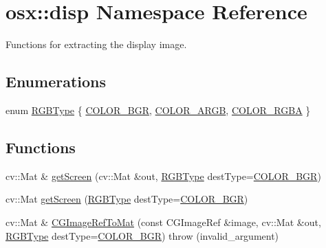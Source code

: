 \hypertarget{namespaceosx_1_1disp}{\section{osx\-:\-:disp Namespace Reference}
\label{namespaceosx_1_1disp}
}


Functions for extracting the display image.  


\subsection*{Enumerations}
\begin{DoxyCompactItemize}
\item 
enum \hyperlink{namespaceosx_1_1disp_a63adf9b0b0b0365ec428dd44fc30c659}{R\-G\-B\-Type} \{ \hyperlink{namespaceosx_1_1disp_a63adf9b0b0b0365ec428dd44fc30c659ab96ecb2ad3c69bf9019d7ed4253603b1}{C\-O\-L\-O\-R\-\_\-\-B\-G\-R}, 
\hyperlink{namespaceosx_1_1disp_a63adf9b0b0b0365ec428dd44fc30c659a307b3e319b6708774c7672d7efc04d0d}{C\-O\-L\-O\-R\-\_\-\-A\-R\-G\-B}, 
\hyperlink{namespaceosx_1_1disp_a63adf9b0b0b0365ec428dd44fc30c659aefca227dbfbf6803b1248aceeaa187b7}{C\-O\-L\-O\-R\-\_\-\-R\-G\-B\-A}
 \}
\end{DoxyCompactItemize}
\subsection*{Functions}
\begin{DoxyCompactItemize}
\item 
cv\-::\-Mat \& \hyperlink{namespaceosx_1_1disp_a31a48e8be1c4213af1131efca04b11dd}{get\-Screen} (cv\-::\-Mat \&out, \hyperlink{namespaceosx_1_1disp_a63adf9b0b0b0365ec428dd44fc30c659}{R\-G\-B\-Type} dest\-Type=\hyperlink{namespaceosx_1_1disp_a63adf9b0b0b0365ec428dd44fc30c659ab96ecb2ad3c69bf9019d7ed4253603b1}{C\-O\-L\-O\-R\-\_\-\-B\-G\-R})
\item 
cv\-::\-Mat \hyperlink{namespaceosx_1_1disp_a5b5e52b79f7873787fa3f399c9ba6e73}{get\-Screen} (\hyperlink{namespaceosx_1_1disp_a63adf9b0b0b0365ec428dd44fc30c659}{R\-G\-B\-Type} dest\-Type=\hyperlink{namespaceosx_1_1disp_a63adf9b0b0b0365ec428dd44fc30c659ab96ecb2ad3c69bf9019d7ed4253603b1}{C\-O\-L\-O\-R\-\_\-\-B\-G\-R})
\item 
cv\-::\-Mat \& \hyperlink{namespaceosx_1_1disp_ab6b57a138594670c726dc3de6425c01e}{C\-G\-Image\-Ref\-To\-Mat} (const C\-G\-Image\-Ref \&image, cv\-::\-Mat \&out, \hyperlink{namespaceosx_1_1disp_a63adf9b0b0b0365ec428dd44fc30c659}{R\-G\-B\-Type} dest\-Type=\hyperlink{namespaceosx_1_1disp_a63adf9b0b0b0365ec428dd44fc30c659ab96ecb2ad3c69bf9019d7ed4253603b1}{C\-O\-L\-O\-R\-\_\-\-B\-G\-R})  throw (invalid\-\_\-argument)
\end{DoxyCompactItemize}


